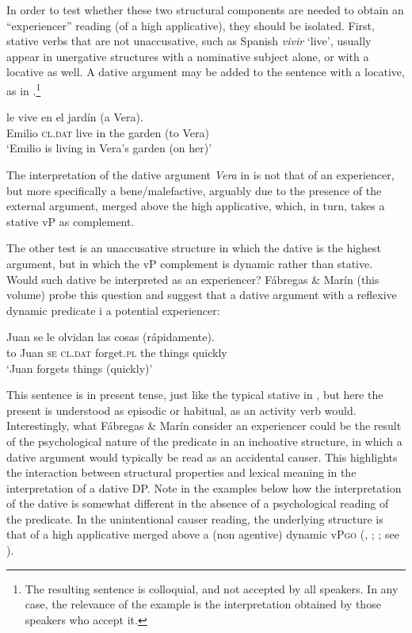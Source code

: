 \documentclass[output=paper,colorlinks,citecolor=brown,nonflat]{./langscibook}
\begin{document}
In order to test whether these two structural components are needed to obtain an “experiencer” reading (of a high applicative), they should be isolated. First, stative verbs that are not unaccusative, such as Spanish \textit{vivir} ‘live’, usually appear in unergative structures with a nominative subject alone, or with a locative as well. A dative argument may be added to the sentence with a locative, as in .\footnote{The resulting sentence is colloquial, and not accepted by all speakers. In any case, the relevance of the example is the interpretation obtained by those speakers who accept it.} 

\ea%
    \label{ex:cuervo:20}
     {le} {vive} {en} {el} {jardín} ({a} {Vera}).\\
    Emilio \textsc{cl.dat}   live in the garden (to  Vera)\\
    \glt ‘Emilio is living in Vera’s garden (on her)’
    \z

The interpretation of the dative argument \textit{Vera} in  is not that of an experiencer, but more specifically a bene/malefactive, arguably due to the presence of the external argument, merged above the high applicative, which, in turn, takes a stative vP as complement. 

The other test is an unaccusative structure in which the dative is the highest argument, but in which the vP complement is dynamic rather than stative. Would such dative be interpreted as an experiencer? Fábregas \& Marín (this volume) probe this question and suggest that a dative argument with a reflexive dynamic predicate i a potential experiencer: 

\ea%
    \label{ex:cuervo:21}
     {Juan} {se} {le} {olvidan} {las} {cosas} {(rápidamente)}.\\
    {to} Juan  \textsc{se} \textsc{cl.dat} forget.\textsc{pl} the things quickly\\
    \glt ‘Juan forgets things (quickly)'
    \z

This sentence is in present tense, just like the typical stative in , but here the present is understood as episodic or habitual, as an activity verb would. Interestingly, what Fábregas \& Marín consider an experiencer could be the result of the psychological nature of the predicate in an inchoative structure, in which a dative argument would typically be read as an accidental causer. This highlights the interaction between structural properties and lexical meaning in the interpretation of a dative DP. Note in the examples below how the interpretation of the dative is somewhat different in the absence of a psychological reading of the predicate. In the unintentional causer reading, the underlying structure is that of a high applicative merged above a (non agentive) dynamic vP\textsc{go} (\citealt{Cuervo2003}, \citeyear{Cuervo2014}; \citealt{Schäfer2008}; see ).
\end{document}

